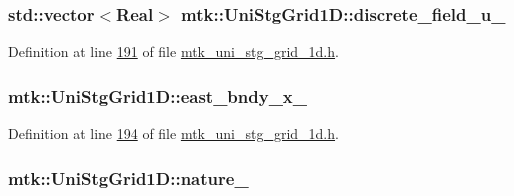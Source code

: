 \hypertarget{classmtk_1_1UniStgGrid1D_a9a1e7c4ff7f83787a1844d8b24af8045}{
\subsubsection[{discrete\+\_\+field\+\_\+u\+\_\+}]{\setlength{\rightskip}{0pt plus 5cm}std\+::vector$<${\bf Real}$>$ mtk\+::\+Uni\+Stg\+Grid1\+D\+::discrete\+\_\+field\+\_\+u\+\_\+\hspace{0.3cm}{\ttfamily [private]}}}\label{classmtk_1_1UniStgGrid1D_a9a1e7c4ff7f83787a1844d8b24af8045}


Definition at line \hyperlink{mtk__uni__stg__grid__1d_8h_source_l00191}{191} of file \hyperlink{mtk__uni__stg__grid__1d_8h_source}{mtk\+\_\+uni\+\_\+stg\+\_\+grid\+\_\+1d.\+h}.

\hypertarget{classmtk_1_1UniStgGrid1D_a69a7d6be3171e53177e476348d04f4ae}{
\subsubsection[{east\+\_\+bndy\+\_\+x\+\_\+}]{ mtk\+::\+Uni\+Stg\+Grid1\+D\+::east\+\_\+bndy\+\_\+x\+\_\+\hspace{0.3cm}{\ttfamily [private]}}}\label{classmtk_1_1UniStgGrid1D_a69a7d6be3171e53177e476348d04f4ae}


Definition at line \hyperlink{mtk__uni__stg__grid__1d_8h_source_l00194}{194} of file \hyperlink{mtk__uni__stg__grid__1d_8h_source}{mtk\+\_\+uni\+\_\+stg\+\_\+grid\+\_\+1d.\+h}.

\hypertarget{classmtk_1_1UniStgGrid1D_a061b66c92532b1498ce0e15418754911}{
\subsubsection[{nature\+\_\+}]{ mtk\+::\+Uni\+Stg\+Grid1\+D\+::nature\+\_\+\hspace{0.3cm}{\ttfamily [private]}}}\label{classmtk_1_1UniStgGrid1D_a061b66c92532b1498ce0e15418754911}


